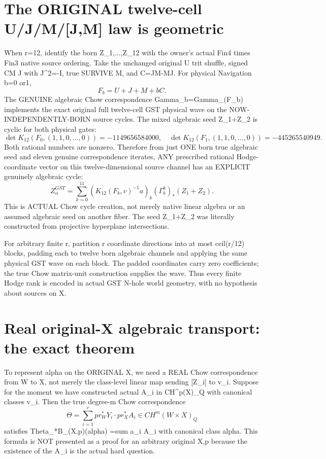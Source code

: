 \documentclass[11pt]{article}
\begin{document}
\section{The ORIGINAL twelve-cell U/J/M/[J,M] law is geometric}
When r=12, identify the born Z_1,...,Z_12
with the owner's actual Fin4 times Fin3
native source ordering. Take the unchanged
original U trit shuffle, signed CM J with
J^2=-I, true SURVIVE M, and C=JM-MJ.
For physical Navigation b=0 or1,
\[
F_b=U+J+M+bC.
\]
The GENUINE algebraic Chow correspondence
Gamma_b=Gamma_(F_b) implements the exact
original full twelve-cell GST physical wave
on the NOW-INDEPENDENTLY-BORN source cycles.
The mixed algebraic seed Z_1+Z_2 is
cyclic for both physical gates:
\[
\det K_{12}(F_0,(1,1,0,...,0))
=-1149656584000,
\quad
\det K_{12}(F_1,(1,1,0,...,0))
=-445265540949.
\]
Both rational numbers are nonzero.
Therefore from just ONE born true
algebraic seed and eleven genuine
correspondence iterates, ANY prescribed
rational Hodge-coordinate vector on this
twelve-dimensional source channel has an
EXPLICIT genuinely algebraic cycle:
\[
\boxed{
Z^{GST}_\alpha
=\sum_{k=0}^{11}
(K_{12}(F_b,v)^{-1}a)_k
(\Gamma_b^k)_*(Z_1+Z_2).
}\tag{4}
\]
This is ACTUAL Chow cycle creation,
not merely native linear algebra or an
assumed algebraic seed on another fiber.
The seed Z_1+Z_2 was literally constructed
from projective hyperplane intersections.

For arbitrary finite r, partition r
coordinate directions into at most
ceil(r/12) blocks, padding each to twelve
born algebraic channels and applying the
same physical GST wave on each block.
The padded coordinates carry zero
coefficients; the true Chow matrix-unit
construction supplies the wave.
Thus every finite Hodge rank is encoded
in actual GST N-hole world geometry,
with no hypothesis about sources on X.

\section{Real original-X algebraic transport: the exact theorem}
To represent alpha on the ORIGINAL X,
we need a REAL Chow correspondence
from W to X, not merely the class-level
linear map sending [Z_i] to v_i.
Suppose for the moment we have constructed
actual A_i in CH^p(X)_Q with canonical classes v_i.
Then the true degree-m Chow correspondence
\[
\Theta=\sum_{i=1}^{r}
pr_W^*Y_i\cdot pr_X^*A_i
\in CH^m(W\times X)_Q
\]
satisfies Theta_*B_(X,p)(alpha)
=sum a_i A_i with canonical class alpha.
This formula is NOT presented as a proof
for an arbitrary original X,p because the
existence of the A_i is the actual hard
question.
\end{document}
